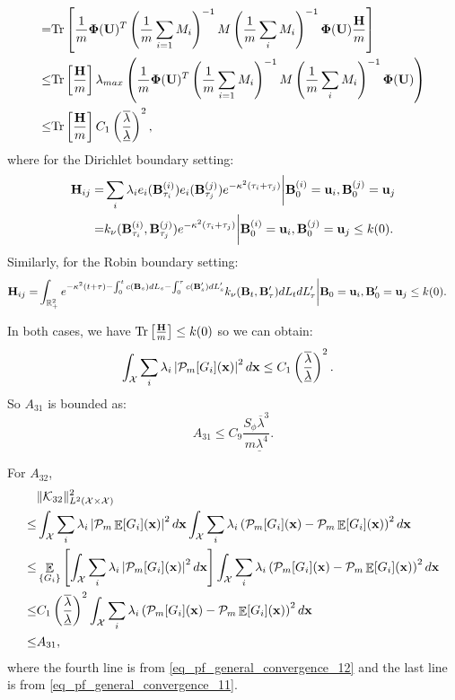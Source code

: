 \documentclass[aos,preprint]{imsart}
\theoremstyle{plain}
\DeclareMathOperator{\E}{\mathbb E}
\newcommand{\Real}{\mathbb R}
\newcommand{\CalX}{\mathcal X}
\newcommand{\CalP}{\mathcal P}
\newcommand{\CalK}{\mathcal K}
\newcommand{\Bx}{\bold x}
\newcommand{\BFx}{\bold x}
\newcommand{\BB}{\bold B}
\newcommand{\BU}{\bold U}
\newcommand{\Bu}{\bold u}
\newcommand{\BPhi}{\boldsymbol{\Phi}}
\theoremstyle{remark}
\begin{document}
\begin{appendix}
\begin{align*}
    =&\text{Tr}\left[\frac{1}{m}{\BPhi(\BU)^T}\left(\frac{1}{m}\sum_{i=1}M_i\right)^{-1}M\left(\frac{1}{m}\sum_iM_i\right)^{-1}{\BPhi(\BU)}\frac{\bold{H}}{m}\right]\\
    \leq & \text{Tr}\left[\frac{\bold{H}}{m}\right]\lambda_{max}\left(\frac{1}{m}{\BPhi(\BU)^T}\left(\frac{1}{m}\sum_{i=1}M_i\right)^{-1}M\left(\frac{1}{m}\sum_iM_i\right)^{-1}{\BPhi(\BU)}\right)\\
    \leq & \text{Tr}\left[\frac{\bold{H}}{m}\right] C_1\left(\frac{\overline{\lambda}}{\underline{\lambda}}\right)^2,
\end{align*}
where for the Dirichlet boundary setting:
\begin{align*}
    \bold{H}_{ij}=&\sum_i\lambda_ie_i(\BB^{(i)}_{\tau_i})e_i(\BB^{(j)}_{\tau_j})e^{-\kappa^2(\tau_i+\tau_j)}\bigg|\BB^{(i)}_0=\Bu_i,\BB^{(j)}_0=\Bu_j\\
    =& k_\nu(\BB^{(i)}_{\tau_i},\BB^{(j)}_{\tau_j})e^{-\kappa^2(\tau_i+\tau_j)}\bigg|\BB^{(i)}_0=\Bu_i,\BB^{(j)}_0=\Bu_j\leq k(0).
\end{align*}
Similarly, for the Robin boundary setting:
\begin{align*}
    \bold{H}_{ij}
    =&\int_{\Real_+^2}e^{-\kappa^2(t+\tau)-\int_0^tc(\BB_s)dL_s-\int_0^\tau c(\BB'_s)dL'_s}k_\nu(\BB_t,\BB'_\tau)dL_tdL'_\tau\bigg|\BB_0=\Bu_i,\BB'_0=\Bu_j\leq k(0).
\end{align*}

In both cases, we have $\text{Tr}\left[\frac{\bold{H}}{m}\right]\leq k(0)$ so we can obtain:
\begin{align}
   &\int_{\CalX}\sum_i\lambda_i\left|\CalP_m[G_i](\BFx)\right|^2d\BFx
    \leq  C_1\left(\frac{\overline{\lambda}}{\underline{\lambda}}\right)^2.\label{eq_pf_general_convergence_12}
\end{align}
So $A_{31}$ is bounded as:
\[A_{31}\leq C_9\frac{S_\phi\overline{\lambda}^3}{m\underline{\lambda}^4}.\]

For $A_{32}$,
\begin{align*}
   &\|\CalK_{32}\|^2_{L^2(\CalX\times\CalX)}\\ \leq&\int_\CalX\sum_i\lambda_i\left|\CalP_m\E[G_i](\BFx)\right|^2d\BFx\int_\CalX\sum_i\lambda_i\left(\CalP_m[G_i](\BFx)-\CalP_m\E[G_i](\BFx)\cal\right)^2d\Bx \\
  \leq&\E_{\{G_i\}}\left[\int_\CalX\sum_i\lambda_i\left|\CalP_m[G_i](\BFx)\right|^2d\BFx\right]\int_\CalX\sum_i\lambda_i\left(\CalP_m[G_i](\BFx)-\CalP_m\E[G_i](\BFx)\cal\right)^2d\Bx \\
  \leq & C_1\left(\frac{\overline{\lambda}}{\underline{\lambda}}\right)^2\int_\CalX\sum_i\lambda_i\left(\CalP_m[G_i](\BFx)-\CalP_m\E[G_i](\BFx)\cal\right)^2d\Bx \\
  \leq & A_{31},
\end{align*}
where the fourth line is from \eqref{eq_pf_general_convergence_12} and the last line is from \eqref{eq_pf_general_convergence_11}.


\end{appendix}
\end{document}
